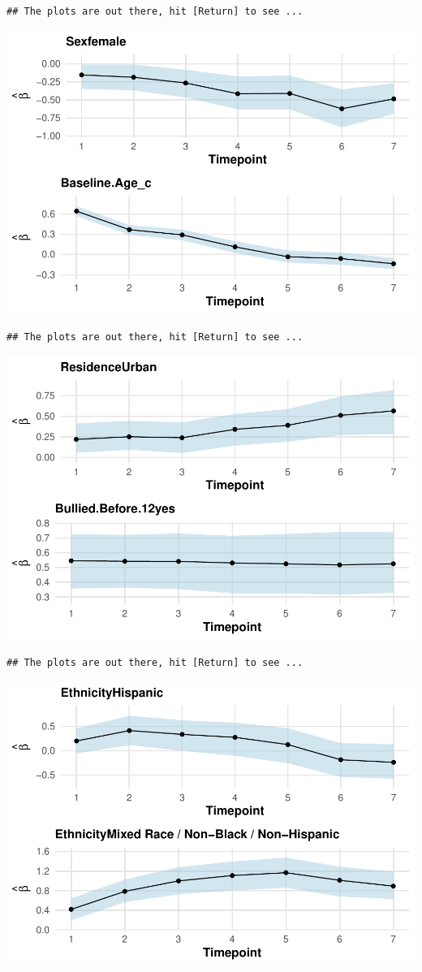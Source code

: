 \documentclass[a4paper, preprint, 3p,
authoryear]{elsarticle} %
\begin{document}
\begin{verbatim}
## The plots are out there, hit [Return] to see ...
\end{verbatim}

\includegraphics[width=0.7\linewidth]{Vignette-for-panelTVP_files/figure-latex/unnamed-chunk-34-2}

\begin{verbatim}
## The plots are out there, hit [Return] to see ...
\end{verbatim}

\includegraphics[width=0.7\linewidth]{Vignette-for-panelTVP_files/figure-latex/unnamed-chunk-34-3}

\begin{verbatim}
## The plots are out there, hit [Return] to see ...
\end{verbatim}

\includegraphics[width=0.7\linewidth]{Vignette-for-panelTVP_files/figure-latex/unnamed-chunk-34-4}
\end{document}
